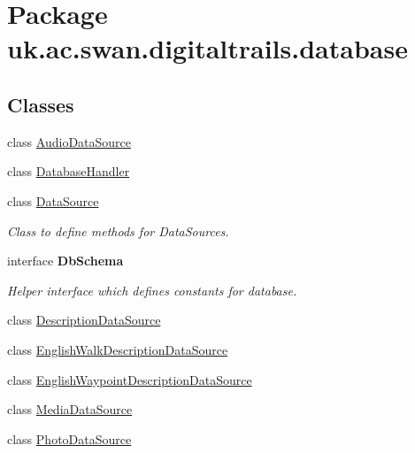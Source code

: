 \hypertarget{namespaceuk_1_1ac_1_1swan_1_1digitaltrails_1_1database}{\section{Package uk.\+ac.\+swan.\+digitaltrails.\+database}
\label{namespaceuk_1_1ac_1_1swan_1_1digitaltrails_1_1database}
}
\subsection*{Classes}
\begin{DoxyCompactItemize}
\item 
class \hyperlink{classuk_1_1ac_1_1swan_1_1digitaltrails_1_1database_1_1_audio_data_source}{Audio\+Data\+Source}
\item 
class \hyperlink{classuk_1_1ac_1_1swan_1_1digitaltrails_1_1database_1_1_database_handler}{Database\+Handler}
\item 
class \hyperlink{classuk_1_1ac_1_1swan_1_1digitaltrails_1_1database_1_1_data_source}{Data\+Source}
\begin{DoxyCompactList}\small\item\em Class to define methods for Data\+Sources. \end{DoxyCompactList}\item 
interface {\bfseries Db\+Schema}
\begin{DoxyCompactList}\small\item\em Helper interface which defines constants for database. \end{DoxyCompactList}\item 
class \hyperlink{classuk_1_1ac_1_1swan_1_1digitaltrails_1_1database_1_1_description_data_source}{Description\+Data\+Source}
\item 
class \hyperlink{classuk_1_1ac_1_1swan_1_1digitaltrails_1_1database_1_1_english_walk_description_data_source}{English\+Walk\+Description\+Data\+Source}
\item 
class \hyperlink{classuk_1_1ac_1_1swan_1_1digitaltrails_1_1database_1_1_english_waypoint_description_data_source}{English\+Waypoint\+Description\+Data\+Source}
\item 
class \hyperlink{classuk_1_1ac_1_1swan_1_1digitaltrails_1_1database_1_1_media_data_source}{Media\+Data\+Source}
\item 
class \hyperlink{classuk_1_1ac_1_1swan_1_1digitaltrails_1_1database_1_1_photo_data_source}{Photo\+Data\+Source}
\item 

\end{DoxyCompactItemize}
